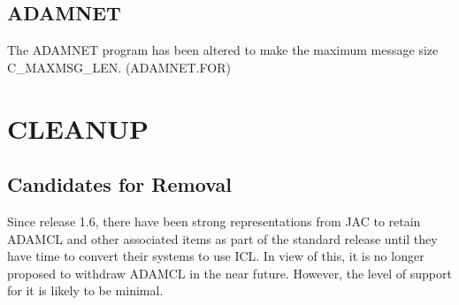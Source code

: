 \subsection{ADAMNET}
The ADAMNET program has been altered to make the maximum message size
C\-\_MAXMSG\-\_LEN. (ADAMNET.FOR)

\section{CLEANUP}
\subsection{Candidates for Removal}
Since release 1.6, there have been strong representations from JAC to retain
ADAMCL and other associated items as part of the standard release until
they have time to convert their systems to use ICL.
In view of this, it is no longer proposed to withdraw ADAMCL in the near 
future.
However, the level of support for it is likely to be minimal.


